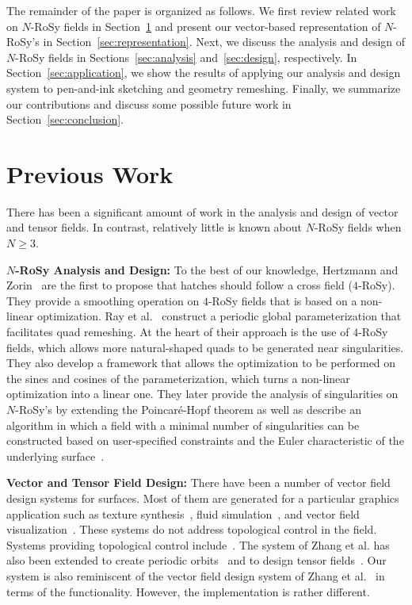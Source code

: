 \documentclass{acmsiggraph}               %
\begin{document}
The remainder of the paper is organized as follows. We first review
related work on $N$-RoSy fields in Section~\ref{sec:previous_work}
and present our vector-based representation of $N$-RoSy's in
Section~\ref{sec:representation}. Next, we discuss the analysis and
design of $N$-RoSy fields in Sections~\ref{sec:analysis}
and~\ref{sec:design}, respectively. In
Section~\ref{sec:application}, we show the results of applying our
analysis and design system to pen-and-ink sketching and geometry
remeshing. Finally, we summarize our contributions and discuss some
possible future work in Section~\ref{sec:conclusion}.

\section{Previous Work}
\label{sec:previous_work}

There has been a significant amount of work in the analysis and
design of vector and tensor fields. In contrast, relatively little
is known about $N$-RoSy fields when $N \ge 3$.

{\bf $N$-RoSy Analysis and Design:} To the best of our knowledge,
Hertzmann and Zorin~ are the first to
propose that hatches should follow a cross field ($4$-RoSy). They
provide a smoothing operation on $4$-RoSy fields that is based on a
non-linear optimization. Ray et al.~ construct a
periodic global parameterization that facilitates quad remeshing. At
the heart of their approach is the use of $4$-RoSy fields, which
allows more natural-shaped quads to be generated near singularities.
They also develop a framework that allows the optimization to be
performed on the sines and cosines of the parameterization, which
turns a non-linear optimization into a linear one. They later
provide the analysis of singularities on $N$-RoSy's by extending the
Poincar\'e-Hopf theorem as well as describe an algorithm in which a
field with a minimal number of singularities can be constructed
based on user-specified constraints and the Euler characteristic of
the underlying surface~\cite{ray:07}.

{\bf Vector and Tensor Field Design:} There have been a number of
vector field design systems for surfaces. Most of them are generated
for a particular graphics application such as texture
synthesis~\cite{Praun:00,Turk:01,Wei:01}, fluid
simulation~\cite{Stam:03}, and vector field
visualization~\cite{vanWijk:02,vanWijk:03}. These systems do not
address topological control in the field. Systems providing
topological control include~\cite{Theisel:02,Zhang:06}. The system
of Zhang et al. has also been extended to create periodic
orbits~\cite{Chen:07} and to design tensor fields~\cite{NEURIPS2018_a41b3bb3}.
Our system is also reminiscent of the vector field design system of
Zhang et al.~ in terms of the functionality.
However, the implementation is rather different.
\end{document}
